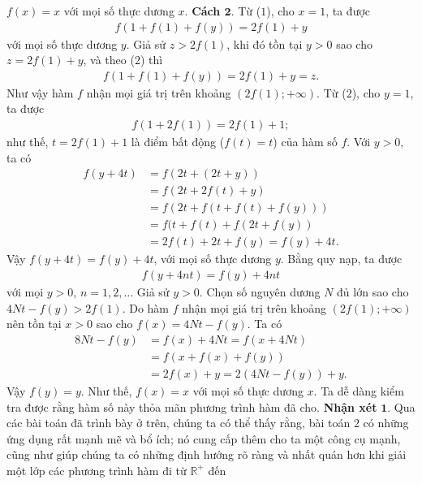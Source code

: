 \begin{multicols}{2}
	$
	f(x)=x$ với mọi số thực dương $x$.
	\vskip 0.1cm
	\textbf{\color{hoccungpi}Cách $\pmb{2.}$} 
	Từ ($1$), cho $x=1$, ta được
	\begin{align*}
		f\left( {1 + f(1) + f(y)} \right) = 2f(1) + y\tag{$2$}
	\end{align*}
	với mọi số thực dương $y$.
	Giả sử $z>2f(1)$, khi đó tồn tại $y>0$ sao cho $z=2f(1)+y$, và theo ($2$) thì
	\begin{align*}
		f\left( {1 + f(1) + f(y)} \right) = 2f(1) + y=z.
	\end{align*}
	Như vậy hàm $f$ nhận mọi giá trị trên khoảng $\left( {2f(1); + \infty } \right)$.
	Từ ($2$), cho $y=1$, ta được
	\begin{align*}
		f\left( {1 + 2f(1)} \right) = 2f(1) + 1;
	\end{align*}
	như thế, $t=2f(1)+1$ là điểm bất động ($f(t)=t$) của hàm số $f$. Với $y>0$, ta có
	\begin{align*}
		f\left( {y + 4t} \right) &= f\left( {2t + (2t + y)} \right)\\
		&= f\left( {2t + 2f(t) + y} \right)\\
		&	= f\left( {2t + f\left( {t + f(t) + f(y)} \right)} \right)\\
		&= f(t + f(t) + f\left( {2t + f(y)} \right)\\
		&= 2f\left( t \right) + 2t + f(y)
		= f(y) + 4t.
	\end{align*}Vậy $	f\left( {y + 4t} \right)= f(y) + 4t$, với mọi số thực dương $y$. Bằng quy nạp, ta được
	\begin{align*}
		f\left( {y + 4nt} \right) = f(y) + 4nt
	\end{align*}
	với mọi  $y>0$, $n=1,2,\ldots$
	Giả sử $y>0$. Chọn số nguyên dương $N$ đủ lớn sao cho
	$4Nt-f(y)>2f(1)$. Do hàm $f$ nhận mọi giá trị trên khoảng $\left( {2f(1); + \infty } \right)$
	nên tồn tại $x>0$ sao cho $f(x)=4Nt-f(y)$.
	Ta có
	\begin{align*}
		8Nt - f(y) &= f(x) + 4Nt = f\left( {x + 4Nt} \right)\\
		& = f\left( {x + f(x) + f(y)} \right)\\
		&= 2f(x) \!+\! y \!=\! 2\left( {4Nt \!-\! f(y)} \right) \!+\! y.
	\end{align*}Vậy $f(y) = y$. Như thế, $f(x)=x$ với mọi số thực dương $x$. Ta dễ dàng kiểm tra được rằng hàm số này thỏa mãn phương trình hàm đã cho.
	\vskip 0.1cm
	\textbf{\color{hoccungpi}Nhận xét} $\pmb{1.}$
	Qua các bài toán đã trình bày ở trên, chúng ta có thể thấy rằng, 
	bài toán $2$ có những ứng dụng rất mạnh mẽ và bổ ích; nó cung cấp thêm cho ta một công cụ mạnh, cũng như giúp chúng ta có những định hướng rõ ràng và nhất quán hơn khi giải một lớp các phương trình hàm đi từ $\mathbb R^+$ đến

\end{multicols}
